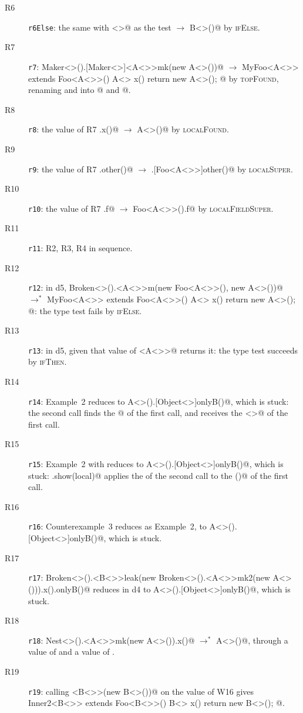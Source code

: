 \begin{description}
\item[R6] \texttt{r6Else}: the same with \Q@B<>@ as the test $\rightarrow$ \Q@new B<>()@ by \textsc{ifElse}.
\item[R7] \texttt{r7}: \Q@new Maker<>().[Maker<>]<A<>>mk(new A<>())@ $\rightarrow$ \Q@new MyFoo<A<>> extends Foo<A<>>(){ A<> x(){ return new A<>(); } }@ by \textsc{topFound}, renaming \Q@Y@ and \Q@y@ into @ and @.
\item[R8] \texttt{r8}: the value of R7 \Q@.x()@ $\rightarrow$ \Q@new A<>()@ by \textsc{localFound}.
\item[R9] \texttt{r9}: the value of R7 \Q@.other()@ $\rightarrow$ \Q@.[Foo<A<>>]other()@ by \textsc{localSuper}.
\item[R10] \texttt{r10}: the value of R7 \Q@.f@ $\rightarrow$ \Q@new Foo<A<>>().f@ by \textsc{localFieldSuper}.
\item[R11] \texttt{r11}: R2, R3, R4 in sequence.
\item[R12] \texttt{r12}: in d5, \Q@new Broken<>().<A<>>m(new Foo<A<>>(), new A<>())@ $\rightarrow^*$ \Q@new MyFoo<A<>> extends Foo<A<>>(){ A<> x(){ return new A<>(); } }@: the type test fails by \textsc{ifElse}.
\item[R13] \texttt{r13}: in d5, \Q@mk@ given that value of \Q@MyFoo<A<>>@ returns it: the type test succeeds by \textsc{ifThen}.
\item[R14] \texttt{r14}: Example~2 reduces to \Q@new A<>().[Object<>]onlyB()@, which is stuck: the second call finds the @ of the first call, and \Q@AsB@ receives the \Q@A<>@ of the first call.
\item[R15] \texttt{r15}: Example~2 with \Q@show@ reduces to \Q@new A<>().[Object<>]onlyB()@, which is stuck: \Q@mine.show(local)@ applies the \Q@f@ of the second call to the \Q@x()@ of the first call.
\item[R16] \texttt{r16}: Counterexample~3 reduces as Example~2, to \Q@new A<>().[Object<>]onlyB()@, which is stuck.
\item[R17] \texttt{r17}: \Q@new Broken<>().<B<>>leak(new Broken<>().<A<>>mk2(new A<>())).x().onlyB()@ reduces in d4 to \Q@new A<>().[Object<>]onlyB()@, which is stuck.
\item[R18] \texttt{r18}: \Q@new Nest<>().<A<>>mk(new A<>()).x()@ $\rightarrow^*$ \Q@new A<>()@, through a value of \Q@Outer@ and a value of \Q@Inner@.
\item[R19] \texttt{r19}: calling \Q@g<B<>>(new B<>())@ on the value of W16 gives \Q@new Inner2<B<>> extends Foo<B<>>(){ B<> x(){ return new B<>(); } }@.

\end{description}
